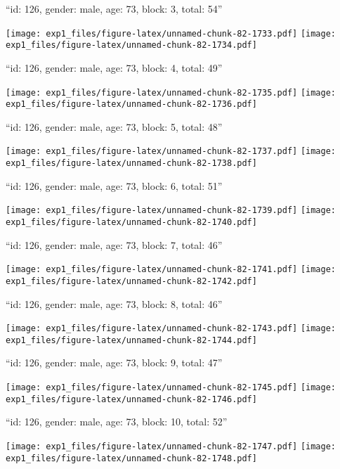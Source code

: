 \documentclass[11pt,,]{article}
\begin{document}
\newpage
[1] 

``id: 126, gender: male, age: 73, block: 3, total: 54''

\texttt{[image: exp1\_files/figure-latex/unnamed-chunk-82-1733.pdf]}
\texttt{[image: exp1\_files/figure-latex/unnamed-chunk-82-1734.pdf]}

\newpage
[1] 

``id: 126, gender: male, age: 73, block: 4, total: 49''

\texttt{[image: exp1\_files/figure-latex/unnamed-chunk-82-1735.pdf]}
\texttt{[image: exp1\_files/figure-latex/unnamed-chunk-82-1736.pdf]}

\newpage
[1] 

``id: 126, gender: male, age: 73, block: 5, total: 48''

\texttt{[image: exp1\_files/figure-latex/unnamed-chunk-82-1737.pdf]}
\texttt{[image: exp1\_files/figure-latex/unnamed-chunk-82-1738.pdf]}

\newpage
[1] 

``id: 126, gender: male, age: 73, block: 6, total: 51''

\texttt{[image: exp1\_files/figure-latex/unnamed-chunk-82-1739.pdf]}
\texttt{[image: exp1\_files/figure-latex/unnamed-chunk-82-1740.pdf]}

\newpage
[1] 

``id: 126, gender: male, age: 73, block: 7, total: 46''

\texttt{[image: exp1\_files/figure-latex/unnamed-chunk-82-1741.pdf]}
\texttt{[image: exp1\_files/figure-latex/unnamed-chunk-82-1742.pdf]}

\newpage
[1] 

``id: 126, gender: male, age: 73, block: 8, total: 46''

\texttt{[image: exp1\_files/figure-latex/unnamed-chunk-82-1743.pdf]}
\texttt{[image: exp1\_files/figure-latex/unnamed-chunk-82-1744.pdf]}

\newpage
[1] 

``id: 126, gender: male, age: 73, block: 9, total: 47''

\texttt{[image: exp1\_files/figure-latex/unnamed-chunk-82-1745.pdf]}
\texttt{[image: exp1\_files/figure-latex/unnamed-chunk-82-1746.pdf]}

\newpage
[1] 

``id: 126, gender: male, age: 73, block: 10, total: 52''

\texttt{[image: exp1\_files/figure-latex/unnamed-chunk-82-1747.pdf]}
\texttt{[image: exp1\_files/figure-latex/unnamed-chunk-82-1748.pdf]}
\end{document}
